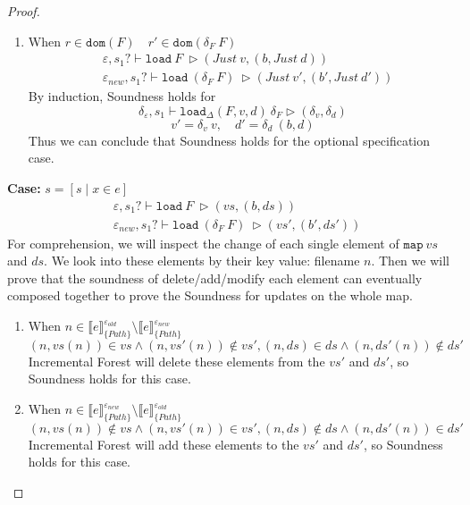 \documentclass[10pt,twoside,a4paper]{article}
\theoremstyle{theorem}
\theoremstyle{lemma}
\theoremstyle{property}
\theoremstyle{definition}
\theoremstyle{assumption}
\begin{document}
\begin{proof}
\begin{enumerate}
	\item
	When $r \in \mathtt{dom}(F) \quad r' \in \mathtt{dom}(\delta_F~F)$
	\begin{align*}
		& \varepsilon, s_1? \vdash \mathtt{load}~ F~ \rhd (Just ~v, (b, Just ~d))\\
		& \varepsilon_{new}, s_1? \vdash \mathtt{load}~ (\delta_F~F)~ \rhd (Just ~v', (b', Just ~d'))
	\end{align*}
	By induction, Soundness holds for
	\begin{displaymath}
		\delta_\varepsilon, s_1 \vdash \mathtt{load}_\Delta (F,v,d)~ \delta_F \rhd (\delta_v,\delta_d)
	\end{displaymath}
	\begin{displaymath}
		v' = \delta_v ~ v, \quad d' = \delta_d ~ (b,d)
	\end{displaymath}
	Thus we can conclude that Soundness holds for the optional specification case.
	\end{enumerate}

	\textbf{Case: } $s = [ s \mid x \in e]$\\
	\begin{align*}
		& \varepsilon, s_1? \vdash \mathtt{load}~ F~ \rhd (vs, (b, ds))\\
		& \varepsilon_{new}, s_1? \vdash \mathtt{load}~ (\delta_F~F)~ \rhd (vs', (b', ds'))
	\end{align*}
	For comprehension, we will inspect the change of each single element of $\mathtt{map} ~vs$ and $ds$. We look into these elements by their key value: filename $n$. Then we will prove that the soundness of delete/add/modify each element can eventually composed together to prove the Soundness for updates on the whole map.
	\begin{enumerate}
	\item
	When $ n \in \llbracket e \rrbracket^{\varepsilon_{old}}_{\{Path\}} \setminus \llbracket e \rrbracket^{\varepsilon_{new}}_{\{Path\}}$
	\begin{displaymath}
		(n, vs(n)) \in vs \wedge (n, vs'(n)) \notin vs', (n, ds) \in ds \wedge (n, ds'(n)) \notin ds'
	\end{displaymath}
	Incremental Forest will delete these elements from the $vs'$ and $ds'$, so Soundness holds for this case.


	\item
	When $ n \in \llbracket e \rrbracket^{\varepsilon_{new}}_{\{Path\}} \setminus \llbracket e \rrbracket^{\varepsilon_{old}}_{\{Path\}}$
	\begin{displaymath}
		(n, vs(n)) \notin vs \wedge (n, vs'(n)) \in vs', (n, ds) \notin ds \wedge (n, ds'(n)) \in ds'
	\end{displaymath}
	Incremental Forest will add these elements to the $vs'$ and $ds'$, so Soundness holds for this case.



\end{enumerate}
\end{proof}
\end{document}

